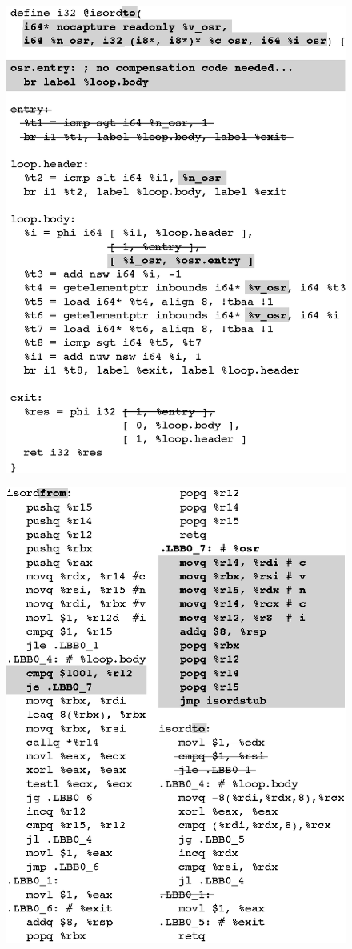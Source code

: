 
\ifdefined\noauthorea
\begin{figure}[ht]
\begin{center}
\includegraphics[width=0.66\columnwidth]{figures/osr-isordto/osr-isordto.eps}
\caption{\protect}
\end{center}
\end{figure}
\fi

\ifdefined\noauthorea
\begin{figure}[t]
\begin{center}
\includegraphics[width=0.66\columnwidth]{figures/osr-isord-x86_64/osr-isord-x86_64.eps}
\caption{\protect}
\end{center}
\end{figure}
\fi

